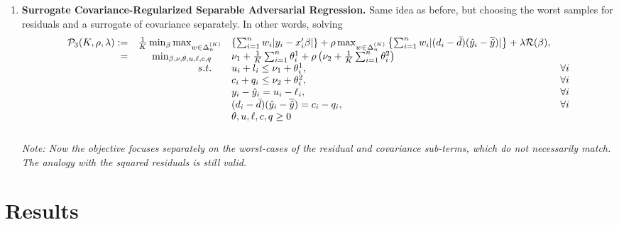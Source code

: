 \documentclass[11pt]{article}
\theoremstyle{plain}
\theoremstyle{definition}
\newcommand{\1}{\mathbf{1}}
\renewcommand{\P}{\mathcal{P}}
\begin{document}
\begin{enumerate}
\item \textbf{Surrogate Covariance-Regularized Separable Adversarial Regression.} Same idea as before, but choosing the worst samples for residuals and a surrogate of covariance separately. In other words, solving 
{\everymath{\displaystyle}
\begin{align*}
    \begin{array}{rrll}
    \P_3(K, \rho, \lambda):=& \frac{1}{K}  \min_{\beta} \max_{w\in \Delta_{n}^{(K)}} & \left\{ \sum_{i=1}^n w_i |y_i - x_i'\beta|\right\} +  \rho \max_{w\in \Delta_{n}^{(K)}} \left\{\sum_{i=1}^n w_i|(d_i - \Bar{d})(\hat{y}_i - \overline{\hat{y}})| \right\} + \lambda \mathcal{R}(\beta), & \\
    =& \min_{\beta, \nu, \theta, u,\ell,c,q} \quad & \nu_1 + \frac{1}{K} \sum_{i=1}^n \theta^{1}_i + \rho \left(\nu_2 + \frac{1}{K} \sum_{i=1}^n \theta_{i}^2\right) \\
    & s.t. \quad  & u_i + l_i  \leq \nu_1 + \theta_{i}^1,& \forall i  \\
    & & c_i + q_i \leq \nu_2 + \theta_i^2,& \forall i  \\
    &   & y_i - \hat{y}_i = u_i - \ell_i, & \forall i  \\
    && (d_i - \Bar{d})(\hat{y}_i - \overline{\hat{y}}) = c_i - q_i, & \forall i\\
   &&  \theta, u, \ell, c, q \geq 0 \\
   & & 
    \end{array}
\end{align*}}
\textit{Note: Now the objective focuses separately on the worst-cases of the residual and covariance sub-terms, which do not necessarily match. The analogy with the squared residuals is still valid.} 

\end{enumerate}


\newpage

\section{Results}
\end{document}
